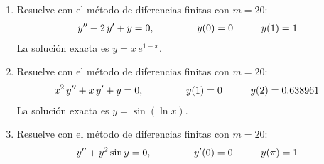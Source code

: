 \begin{enumerate}
\item Resuelve con el método de diferencias finitas con $m = 20$:
\begin{align*}
{y}^{\prime \prime} + 2 \, {y}^{\prime} + y = 0, \hspace{1.5cm} y (0) = 0 \hspace{1cm} y (1) = 1
\end{align*}
La solución exacta es $y = x \, e^{1-x}$.
\item Resuelve con el método de diferencias finitas con $m = 20$:
\begin{align*}
x^{2} \, {y}^{\prime \prime} + x \, {y}^{\prime} + y = 0, \hspace{1.5cm} y (1) = 0 \hspace{1cm} y (2) = 0.638961
\end{align*}
La solución exacta es $y = \sin(\ln x)$.
\item Resuelve con el método de diferencias finitas con $m = 20$:
\begin{align*}
{y}^{\prime \prime} + y^{2} \sin y = 0, \hspace{1.5cm} {y}^{\prime} (0) = 0 \hspace{1cm} y (\pi) = 1
\end{align*}
\end{enumerate}


